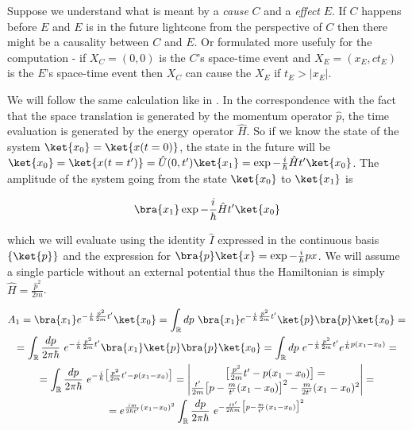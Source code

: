 \begin{definition}
    \label{df:causality}
    Suppose we understand what is meant by a \textit{cause} $C$ and a \textit{effect} $E$. If $C$ happens before $E$ and 
    $E$ is in the future lightcone from the perspective of $C$ then there might be a causality between $C$ and $E$.  Or
    formulated more usefuly for the computation - if $X_{C} = (0, 0)$ is the $C$'s space-time event and 
    $X_{E} = (x_{E}, ct_{E})$ is the $E$'s space-time event then $X_{C}$ can cause the $X_{E}$ if $t_{E} > |x_{E}|$.
\end{definition}

We will follow the same calculation like in \cite{peskin_schroeder}. In the correspondence with the fact that the space translation
is generated by the momentum operator $\hat{p}$, the time evaluation is generated by the energy operator $\hat{H}$. So
if we know the state of the system $\ket{x_{0}} = \ket{x(t=0)}$, the state in the future will be 
$\ket{x_{0}} = \ket{x(t=t')} = \hat{U}(0, t') \ket{x_{1}} = \exp{- \frac{i}{\hbar} \hat{H} t'} \ket{x_{0}}$. The amplitude of the
system going from the state $\ket{x_{0}}$ to $\ket{x_{1}}$ is 

\begin{equation}
    \bra{x_{1}} \exp{- \frac{i}{\hbar} \hat{H} t'}\ket{x_{0}}
\end{equation}

which we will evaluate using the identity $\hat{I}$ expressed in the continuous basis $\{\ket{p}\}$ and the expression for
$\bra{p}\ket{x} = \exp{- \frac{i}{\hbar} p x}$. We will assume a single particle without an external potential thus the
Hamiltonian is simply $\hat{H} = \frac{\hat{p}^{2}}{2m}$.

\begin{equation*}
    \begin{gathered}
        A_{1} = \bra{x_{1}} e^{- \frac{i}{\hbar} \frac{\hat{p}^{2}}{2m} t'}\ket{x_{0}} = \int_{\mathbb{R}} dp \ \bra{x_{1}} e^{- \frac{i}{\hbar} \frac{\hat{p}^{2}}{2m} t'}\ket{p} \bra{p} \ket{x_{0}} = \\
        = \int_{\mathbb{R}} \frac{dp}{2 \pi \hbar} \ e^{- \frac{i}{\hbar} \frac{p^{2}}{2m} t'} \bra{x_{1}}\ket{p} \bra{p} \ket{x_{0}} = \int_{\mathbb{R}} dp \ e^{- \frac{i}{\hbar} \frac{p^{2}}{2m} t'} e^{\frac{i}{\hbar}p (x_{1} - x_{0})} = \\
        = \int_{\mathbb{R}} \frac{dp}{2 \pi \hbar} \ e^{- \frac{i}{\hbar} \big[\frac{p^{2}}{2m} t' - p (x_{1} - x_{0})\big]} = 
        \begin{vmatrix}
            \big[\frac{p^{2}}{2m} t' - p (x_{1} - x_{0})\big] =  \\
            \frac{t'}{2m} \big[p - \frac{m}{t'}(x_{1} - x_{0})\big]^{2} - \frac{m}{2t'}(x_{1} - x_{0})^{2} \\
        \end{vmatrix} = \\
        = e^{\frac{im}{2\hbar t'} (x_{1} - x_{0})^{2}} \int_{\mathbb{R}} \frac{dp}{2 \pi \hbar} \ e^{- \frac{i t'}{2 \hbar m} \big[p - \frac{m}{t'}(x_{1} - x_{0})\big]^{2}} \\
    \end{gathered}
\end{equation*}

